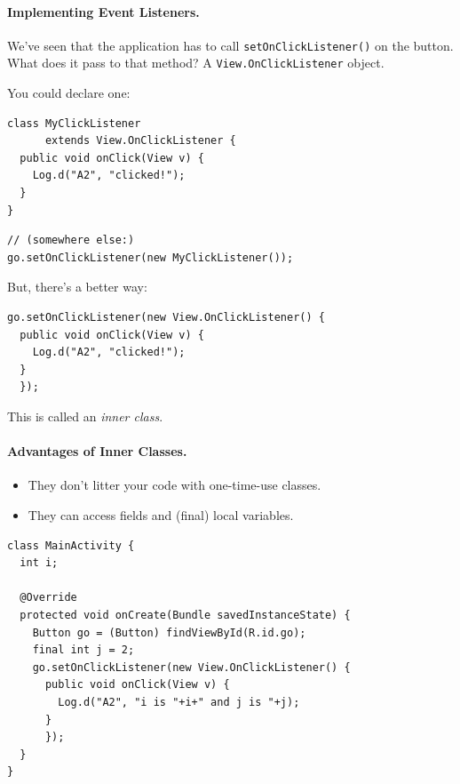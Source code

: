 \paragraph{Implementing Event Listeners.}
We've seen that the application has to call {\tt setOnClickListener()} 
on the button. What does it pass to that method? A {\tt View.OnClickListener} object.

You could declare one:

{\small
\begin{minipage}{.5\textwidth}
\begin{verbatim}
class MyClickListener 
      extends View.OnClickListener {
  public void onClick(View v) {
    Log.d("A2", "clicked!");
  }
}
\end{verbatim}
\end{minipage}
\begin{minipage}{.5\textwidth}
\begin{verbatim}
// (somewhere else:)
go.setOnClickListener(new MyClickListener()); 
\end{verbatim}
\end{minipage}
}

But, there's a better way:

{\small
\begin{verbatim}
go.setOnClickListener(new View.OnClickListener() {
  public void onClick(View v) {
    Log.d("A2", "clicked!");
  }
  }); 
\end{verbatim}
}

This is called an \emph{inner class}.

\paragraph{Advantages of Inner Classes.}
\begin{itemize}
\item They don't litter your code with one-time-use classes.
\item They can access fields and (final) local variables.
\end{itemize}

{\small
\begin{verbatim}
class MainActivity {
  int i;

  @Override
  protected void onCreate(Bundle savedInstanceState) {
    Button go = (Button) findViewById(R.id.go);
    final int j = 2;
    go.setOnClickListener(new View.OnClickListener() {
      public void onClick(View v) {
        Log.d("A2", "i is "+i+" and j is "+j);
      }
      }); 
  }
}
\end{verbatim}
}

